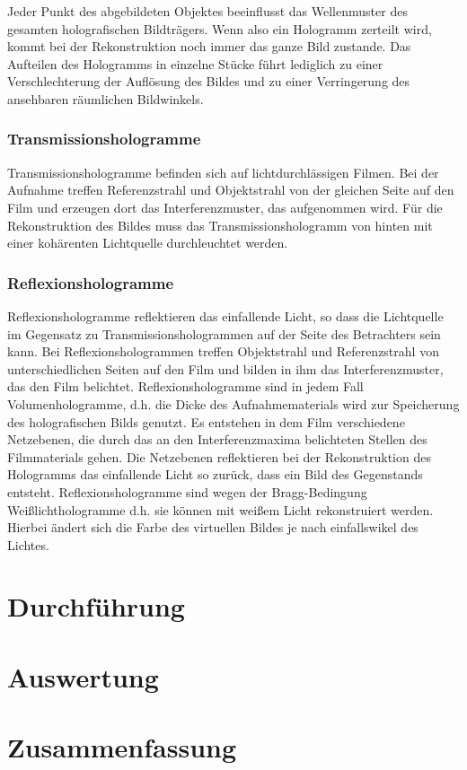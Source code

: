 \documentclass[12pt]{article}
\begin{document}
Jeder Punkt des abgebildeten Objektes beeinflusst das Wellenmuster des gesamten holografischen Bildträgers. Wenn also ein Hologramm zerteilt wird, kommt bei
der Rekonstruktion noch immer das ganze Bild zustande. Das Aufteilen des Hologramms in einzelne Stücke führt lediglich zu einer Verschlechterung der
Auflösung des Bildes und zu einer Verringerung des ansehbaren räumlichen Bildwinkels.

\subsubsection{Transmissionshologramme}
Transmissionshologramme befinden sich auf lichtdurchlässigen Filmen. Bei der Aufnahme treffen Referenzstrahl und Objektstrahl von der gleichen Seite auf
den Film und erzeugen dort das Interferenzmuster, das aufgenommen wird.
Für die Rekonstruktion des Bildes muss das Transmissionshologramm von hinten mit einer kohärenten Lichtquelle durchleuchtet werden.

\subsubsection{Reflexionshologramme}
Reflexionshologramme reflektieren das einfallende Licht, so dass die Lichtquelle im Gegensatz zu Transmissionshologrammen auf der Seite des Betrachters sein
kann. Bei Reflexionshologrammen treffen Objektstrahl und Referenzstrahl von unterschiedlichen Seiten auf den Film und bilden in ihm das Interferenzmuster, das 
den Film belichtet. Reflexionshologramme sind in jedem Fall Volumenhologramme, d.h. die Dicke des Aufnahmematerials wird zur Speicherung des holografischen 
Bilds genutzt. Es entstehen in dem Film verschiedene Netzebenen, die durch das an den Interferenzmaxima belichteten Stellen des Filmmaterials gehen. Die 
Netzebenen reflektieren bei der Rekonstruktion des Hologramms das einfallende Licht so zurück, dass ein Bild des Gegenstands entsteht. Reflexionshologramme 
sind wegen der Bragg-Bedingung Weißlichthologramme d.h. sie können mit weißem Licht rekonstruiert werden. Hierbei ändert sich die Farbe des virtuellen Bildes
je nach einfallswikel des Lichtes.

\section{Durchführung}
\section{Auswertung}
\section{Zusammenfassung}
\end{document}
